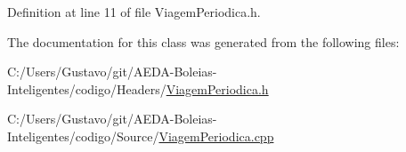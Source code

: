 Definition at line 11 of file Viagem\+Periodica.\+h.



The documentation for this class was generated from the following files\+:\begin{DoxyCompactItemize}
\item 
C\+:/\+Users/\+Gustavo/git/\+A\+E\+D\+A-\/\+Boleias-\/\+Inteligentes/codigo/\+Headers/\hyperlink{_viagem_periodica_8h}{Viagem\+Periodica.\+h}\item 
C\+:/\+Users/\+Gustavo/git/\+A\+E\+D\+A-\/\+Boleias-\/\+Inteligentes/codigo/\+Source/\hyperlink{_viagem_periodica_8cpp}{Viagem\+Periodica.\+cpp}\end{DoxyCompactItemize}
